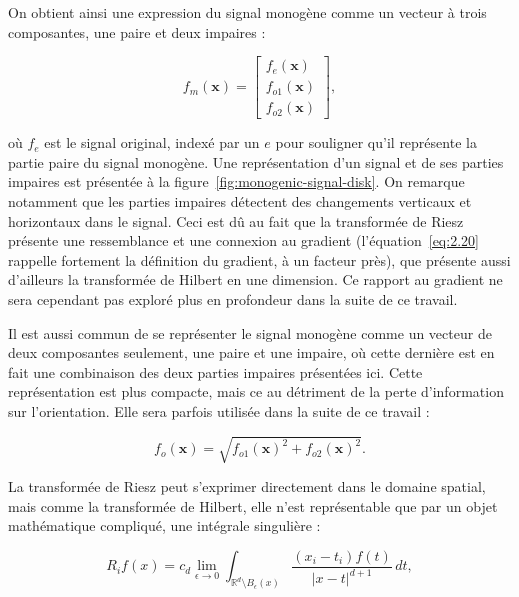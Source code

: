 On obtient ainsi une expression du signal monogène comme un vecteur à trois composantes, une paire et deux impaires :

\begin{equation}
    f_m(\mathbf{x}) =
    \left[
        \begin{array}{c}
        f_e(\mathbf{x}) \\
        f_{o1}(\mathbf{x}) \\
        f_{o2}(\mathbf{x})
        \end{array}
    \right],
\end{equation}

où $f_e$ est le signal original, indexé par un $e$ pour souligner qu'il représente la partie paire du signal monogène. Une représentation d'un signal et de ses parties impaires est présentée à la figure~\ref{fig:monogenic-signal-disk}. On remarque notamment que les parties impaires détectent des changements verticaux et horizontaux dans le signal. Ceci est dû au fait que la transformée de Riesz présente une ressemblance et une connexion au gradient (l'équation~\ref{eq:2.20} rappelle fortement la définition du gradient, à un facteur près), que présente aussi d'ailleurs la transformée de Hilbert en une dimension. Ce rapport au gradient ne sera cependant pas exploré plus en profondeur dans la suite de ce travail.

Il est aussi commun de se représenter le signal monogène comme un vecteur de deux composantes seulement, une paire et une impaire, où cette dernière est en fait une combinaison des deux parties impaires présentées ici. Cette représentation est plus compacte, mais ce au détriment de la perte d'information sur l'orientation. Elle sera parfois utilisée dans la suite de ce travail :

\begin{equation}
    f_o(\mathbf{x}) = \sqrt{f_{o1}(\mathbf{x})^2 + f_{o2}(\mathbf{x})^2}.
\end{equation}

La transformée de Riesz peut s'exprimer directement dans le domaine spatial, mais comme la transformée de Hilbert, elle n'est représentable que par un objet mathématique compliqué, une intégrale singulière :

\begin{equation}
    R_if(x) = c_d \lim_{\epsilon \to 0}\int_{\mathbb{R}^d\setminus B_\epsilon(x)}\frac{(x_i-t_i)f(t)}{|x-t|^{d+1}}\,dt,
    \label{eq:riesz-transform-spatial}
\end{equation}

